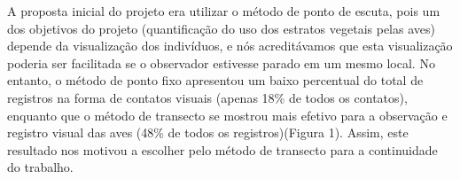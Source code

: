 A proposta inicial do projeto era utilizar o método de ponto de escuta, pois um dos objetivos do projeto (quantificação do uso dos estratos vegetais pelas aves) depende da visualização dos indivíduos, e nós acreditávamos que esta visualização poderia ser facilitada se o observador estivesse parado em um mesmo local. No entanto, o método de ponto fixo apresentou um baixo percentual do total de registros na forma de contatos visuais (apenas 18\% de todos os contatos), enquanto que o método de transecto se mostrou mais efetivo para a observação e registro visual das aves (48\% de todos os registros)(Figura 1). Assim, este resultado nos motivou a escolher pelo método de transecto para a continuidade do trabalho.




